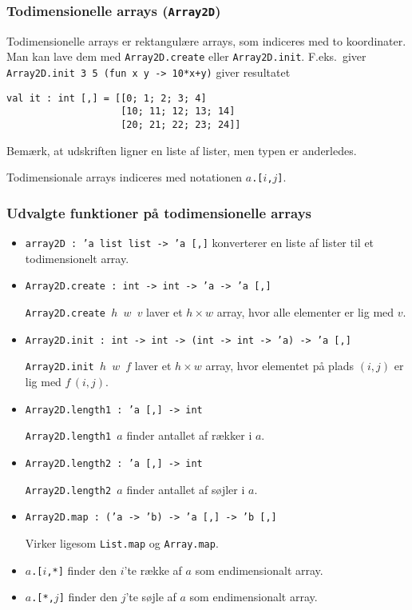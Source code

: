 \documentclass{beamer}
\begin{document}
\begin{frame}[fragile=singleslide]
\frametitle{Todimensionelle arrays (\texttt{Array2D})}

Todimensionelle arrays er rektangulære arrays, som indiceres med to
koordinater.  Man kan lave dem med \texttt{Array2D.create} eller
\texttt{Array2D.init}.  F.eks.\ giver \texttt{Array2D.init 3 5 (fun x
  y -> 10*x+y)} giver resultatet

\begin{verbatim}
val it : int [,] = [[0; 1; 2; 3; 4]
                    [10; 11; 12; 13; 14]
                    [20; 21; 22; 23; 24]]
\end{verbatim}

Bemærk, at udskriften ligner en liste af lister, men typen er anderledes.

Todimensionale arrays indiceres med notationen \texttt{$a$.[$i$,$j$]}.

\end{frame}

\begin{frame}%
\frametitle{Udvalgte funktioner på todimensionelle arrays}

\begin{itemize}
\item \texttt{array2D : 'a list list -> 'a\,[,]}  konverterer en liste
  af lister til et todimensionelt array.

\item \texttt{Array2D.create\,:\,int\,->\,int\,->\,'a\,->\,'a\,[,]}

\texttt{Array2D.create\,$h$\,$w$\,$v$} laver et $h×w$ array, hvor alle
elementer er lig med $v$.

\item \texttt{Array2D.init\,:\,int\,->\,int\,->\,(int\,->\,int\,->\,'a)\,->\,'a\,[,]}

\texttt{Array2D.init\,$h$\,$w$\,$f$} laver et $h×w$ array, hvor
elementet på plads $(i,j)$ er lig med $f\,(i,j)$.

\item \texttt{Array2D.length1\,:\,'a\,[,]\,->\,int}

\texttt{Array2D.length1\,$a$} finder antallet af rækker i $a$.

\item \texttt{Array2D.length2\,:\,'a\,[,]\,->\,int}

\texttt{Array2D.length2\,$a$} finder antallet af søjler i $a$.

\item \texttt{Array2D.map\,:\,('a\,->\,'b)\,->\,'a\,[,]\,->\,'b\,[,]}

Virker ligesom \texttt{List.map} og  \texttt{Array.map}.

\item \texttt{$a$.[$i$,*]} finder den $i$'te række af $a$ som
  endimensionalt array.

\item \texttt{$a$.[*,$j$]} finder den $j$'te søjle af $a$ som
  endimensionalt array.

\end{itemize}


\end{frame}
\end{document}
